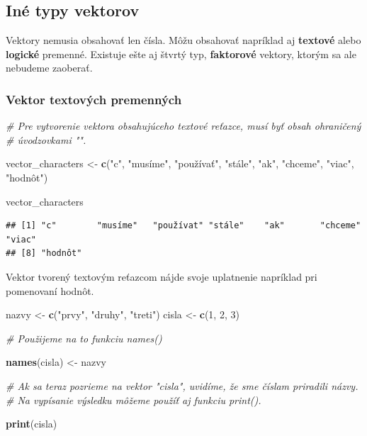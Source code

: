 \documentclass[]{article}
\newenvironment{Shaded}{\begin{snugshade}}{\end{snugshade}}
\newcommand{\CommentTok}[1]{\textcolor[rgb]{0.56,0.35,0.01}{\textit{#1}}}
\newcommand{\DecValTok}[1]{\textcolor[rgb]{0.00,0.00,0.81}{#1}}
\newcommand{\KeywordTok}[1]{\textcolor[rgb]{0.13,0.29,0.53}{\textbf{#1}}}
\newcommand{\NormalTok}[1]{#1}
\newcommand{\StringTok}[1]{\textcolor[rgb]{0.31,0.60,0.02}{#1}}
\begin{document}
\hypertarget{inuxe9-typy-vektorov}{%
\subsection{Iné typy vektorov}\label{inuxe9-typy-vektorov}}

Vektory nemusia obsahovať len čísla. Môžu obsahovať napríklad aj
\textbf{textové} alebo \textbf{logické} premenné. Existuje ešte aj
štvrtý typ, \textbf{faktorové} vektory, ktorým sa ale nebudeme zaoberať.

\hypertarget{vektor-textovuxfdch-premennuxfdch}{%
\subsubsection{Vektor textových
premenných}\label{vektor-textovuxfdch-premennuxfdch}}

\begin{Shaded}
\begin{Highlighting}[]
\CommentTok{# Pre vytvorenie vektora obsahujúceho textové reťazce, musí byť obsah ohraničený}
\CommentTok{# úvodzovkami "".}

\NormalTok{vector_characters <-}\StringTok{ }\KeywordTok{c}\NormalTok{(}\StringTok{"c"}\NormalTok{, }\StringTok{"musíme"}\NormalTok{, }\StringTok{"používať"}\NormalTok{, }\StringTok{"stále"}\NormalTok{, }\StringTok{"ak"}\NormalTok{, }\StringTok{"chceme"}\NormalTok{,}
                       \StringTok{"viac"}\NormalTok{, }\StringTok{"hodnôt"}\NormalTok{)}

\NormalTok{vector_characters}
\end{Highlighting}
\end{Shaded}

\begin{verbatim}
## [1] "c"        "musíme"   "používat" "stále"    "ak"       "chceme"   "viac"    
## [8] "hodnôt"
\end{verbatim}

Vektor tvorený textovým reťazcom nájde svoje uplatnenie napríklad pri
pomenovaní hodnôt.

\begin{Shaded}
\begin{Highlighting}[]
\NormalTok{nazvy <-}\StringTok{ }\KeywordTok{c}\NormalTok{(}\StringTok{"prvy"}\NormalTok{, }\StringTok{"druhy"}\NormalTok{, }\StringTok{"treti"}\NormalTok{)}
\NormalTok{cisla <-}\StringTok{ }\KeywordTok{c}\NormalTok{(}\DecValTok{1}\NormalTok{, }\DecValTok{2}\NormalTok{, }\DecValTok{3}\NormalTok{)}

\CommentTok{# Použijeme na to funkciu names()}

\KeywordTok{names}\NormalTok{(cisla) <-}\StringTok{ }\NormalTok{nazvy}

\CommentTok{# Ak sa teraz pozrieme na vektor "cisla", uvidíme, že sme číslam priradili názvy.}
\CommentTok{# Na vypísanie výsledku môžeme použíť aj funkciu print().}

\KeywordTok{print}\NormalTok{(cisla)}
\end{Highlighting}
\end{Shaded}
\end{document}
